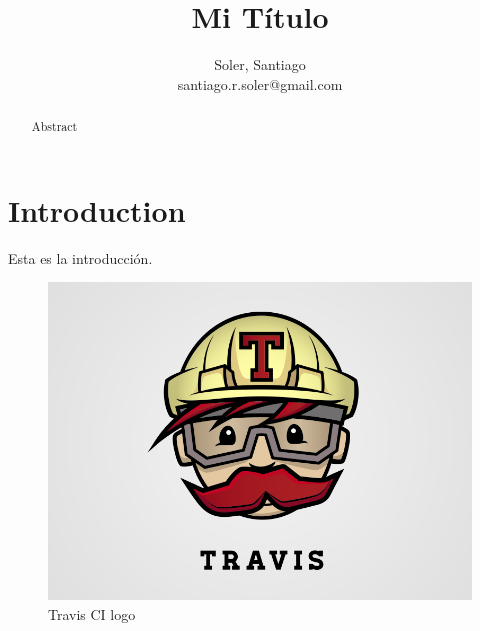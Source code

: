 \documentclass[a4paper,12pt]{article}
\title{Mi Título}
\author{Soler, Santiago \\{\small santiago.r.soler@gmail.com }}
\date{}
\begin{document}
\maketitle

\begin{abstract}
Abstract
\end{abstract}


\section{Introduction}

Esta es la introducción.

\begin{figure}[h]
\centering
\includegraphics[width=\textwidth]{figs/travis.png}
\caption{Travis CI logo}
\end{figure}
\end{document}
